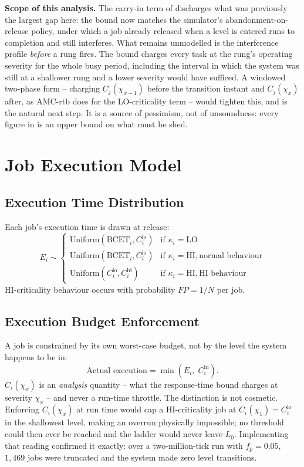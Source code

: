 \documentclass{article}
\begin{document}
\textbf{Scope of this analysis.} The carry-in term of 
discharges what was previously the largest gap here: the bound now matches the
simulator's abandonment-on-release policy, under which a job already released
when a level is entered runs to completion and still interferes. What remains
unmodelled is the interference profile \emph{before} a rung fires. The bound
charges every task at the rung's operating severity for the whole busy period,
including the interval in which the system was still at a shallower rung and a
lower severity would have sufficed. A windowed two-phase form -- charging
$C_j(\chi_{x-1})$ before the transition instant and $C_j(\chi_x)$ after, as
AMC-rtb does for the LO-criticality term -- would tighten this, and is the
natural next step. It is a source of pessimism, not of unsoundness: every
figure in  is an upper bound on what must be shed.

\section{Job Execution Model}

\subsection{Execution Time Distribution}

Each job's execution time is drawn at release:
\[
E_i \sim
\begin{cases}
\mathrm{Uniform}(\mathrm{BCET}_i, C_i^{\mathrm{lo}}) & \text{if } \kappa_i = \mathrm{LO} \\
\mathrm{Uniform}(\mathrm{BCET}_i, C_i^{\mathrm{lo}}) & \text{if } \kappa_i = \mathrm{HI}, \text{normal behaviour} \\
\mathrm{Uniform}(C_i^{\mathrm{lo}}, C_i^{\mathrm{hi}}) & \text{if } \kappa_i = \mathrm{HI}, \text{HI behaviour}
\end{cases}
\]
HI-criticality behaviour occurs with probability $FP = 1/N$ per job.

\subsection{Execution Budget Enforcement}

A job is constrained by its own worst-case budget, not by the level the system
happens to be in:
\[
\text{Actual execution} = \min\!\left(E_i,\; C_i^{\mathrm{hi}}\right).
\]
$C_i(\chi_x)$ is an \emph{analysis} quantity -- what the response-time bound
charges at severity $\chi_x$ -- and never a run-time throttle. The distinction
is not cosmetic. Enforcing $C_i(\chi_x)$ at run time would cap a HI-criticality
job at $C_i(\chi_1) = C_i^{\mathrm{lo}}$ in the shallowest level, making an
overrun physically impossible; no threshold could then ever be reached and the
ladder would never leave $L_0$. Implementing that reading confirmed it exactly:
over a two-million-tick run with $f_p = 0.05$, $1{,}469$ jobs were truncated
and the system made zero level transitions.
\end{document}
